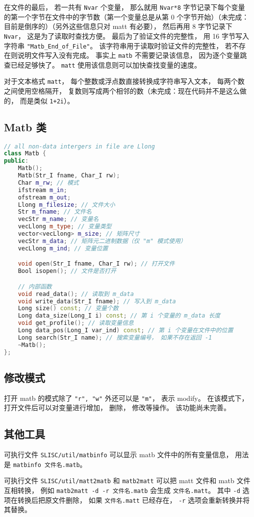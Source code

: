 在文件的最后， 若一共有 \verb|Nvar| 个变量， 那么就用 \verb|Nvar*8| 字节记录下每个变量的第一个字节在文件中的字节数（第一个变量总是从第 0 个字节开始）（未完成：目前是倒序的）（另外这些信息只对 matt 有必要）， 然后再用 8 字节记录下 \verb|Nvar|， 这是为了读取时查找方便。 最后为了验证文件的完整性， 用 16 字节写入字符串 \verb|"Matb_End_of_File"|。 该字符串用于读取时验证文件的完整性， 若不存在则说明文件写入没有完成。 事实上 \verb|matb| 不需要记录该信息， 因为逐个变量跳查已经足够快了。 \verb|matt| 使用该信息则可以加快查找变量的速度。

对于文本格式 \verb|matt|， 每个整数或浮点数直接转换成字符串写入文本， 每两个数之间使用空格隔开， 复数则写成两个相邻的数（未完成：现在代码并不是这么做的， 而是类似 \verb|1+2i|）。

\subsection{Matb 类}
\begin{lstlisting}[language=cpp]
// all non-data intergers in file are Llong
class Matb {
public:
    Matb();
    Matb(Str_I fname, Char_I rw);
    Char m_rw; // 模式
    ifstream m_in;
    ofstream m_out;
    Llong m_filesize; // 文件大小
    Str m_fname; // 文件名
    vecStr m_name; // 变量名
    vecLlong m_type; // 变量类型
    vector<vecLlong> m_size; // 矩阵尺寸
    vecStr m_data; // 矩阵元二进制数据（仅 "m" 模式使用）
    vecLlong m_ind; // 变量位置

    void open(Str_I fname, Char_I rw); // 打开文件
    Bool isopen(); // 文件是否打开

    // 内部函数
    void read_data(); // 读取到 m_data
    void write_data(Str_I fname); // 写入到 m_data
    Long size() const; // 变量个数
    Long data_size(Long_I i) const; // 第 i 个变量的 m_data 长度
    void get_profile(); // 读取变量信息
    Long data_pos(Long_I var_ind) const; // 第 i 个变量在文件中的位置
    Long search(Str_I name); // 搜索变量编号， 如果不存在返回 -1
    ~Matb();
};
\end{lstlisting}

\subsection{修改模式}
打开 matb 的模式除了 \verb|"r", "w"| 外还可以是 \verb|"m"|， 表示 modify。 在该模式下， 打开文件后可以对变量进行增加， 删除， 修改等操作。 该功能尚未完善。

\subsection{其他工具}
可执行文件 \verb|SLISC/util/matbinfo| 可以显示 matb 文件中的所有变量信息， 用法是 \verb|matbinfo 文件名.matb|。

可执行文件 \verb|SLISC/util/matt2matb| 和 \verb|matb2matt| 可以把 matt 文件和 matb 文件互相转换， 例如 \verb|matb2matt -d -r 文件名.matb| 会生成 \verb|文件名.matt|。 其中 \verb|-d| 选项在转换后把原文件删除， 如果 \verb|文件名.matt| 已经存在， \verb|-r| 选项会重新转换并将其替换。
